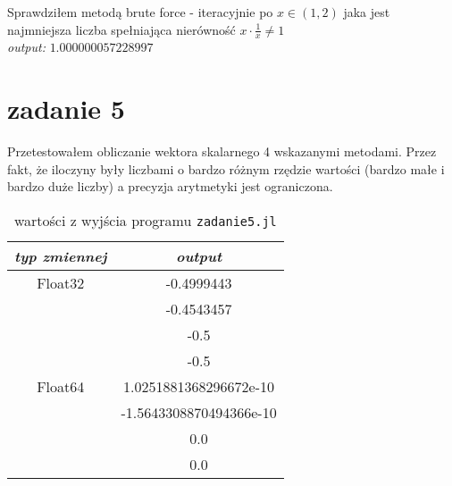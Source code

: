 \documentclass[11pt, a4paper]{article}
\begin{document}
  Sprawdziłem metodą brute force - iteracyjnie po $x \in (1, 2)$ jaka jest najmniejsza liczba spełniająca nierówność $x \cdot \frac{1}{x} \neq 1$
  \\
  \emph{output: } $1.000000057228997$
  \section*{zadanie 5}
  Przetestowałem obliczanie wektora skalarnego 4 wskazanymi metodami. Przez fakt, że iloczyny były liczbami o bardzo różnym rzędzie wartości (bardzo małe i bardzo duże liczby) a precyzja arytmetyki jest ograniczona.

  \begin{table}[ht]
    \centering
    \begin{tabular}{|c|c|}
      \hline
      \emph{typ zmiennej} & \emph{output} \\
      \hline
      \hline
      Float32 & -0.4999443 \\
       & -0.4543457 \\
       & -0.5 \\
       & -0.5 \\
      \hline
      Float64 & 1.0251881368296672e-10 \\
       & -1.5643308870494366e-10 \\
       & 0.0 \\
       & 0.0 \\
      \hline
    \end{tabular}
    \caption{wartości z wyjścia programu \texttt{zadanie5.jl}}
  \end{table}
  
\end{document}
